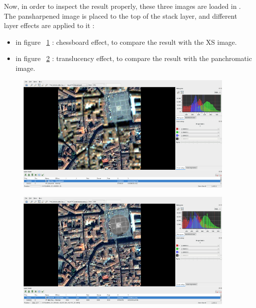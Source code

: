 Now, in order to inspect the result properly, these three images are loaded in \mont.
The pansharpened image is placed to the top of the stack layer, and different layer effects are applied to it :
\begin{itemize}
\item in figure ~\ref{fig:ps4} : chessboard effect, to compare the result with the XS image.
\item in figure ~\ref{fig:ps5} : translucency effect, to compare the result with the panchromatic image.
\end{itemize}

\begin{figure}[!h] 
  \center
  \includegraphics[width=0.95\textwidth]{../Art/MonteverdiImages/ps4.png}
  \label{fig:ps4}
\end{figure}

\begin{figure}[!h] 
  \center
  \includegraphics[width=0.95\textwidth]{../Art/MonteverdiImages/ps5.png}
  \label{fig:ps5}
\end{figure}

